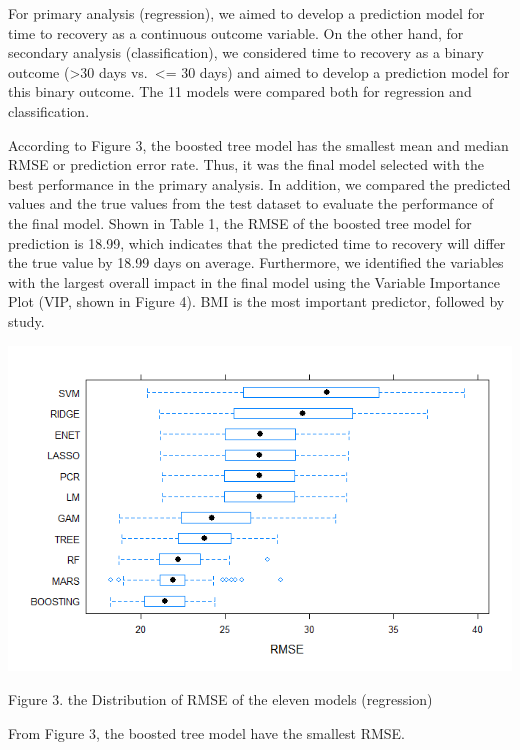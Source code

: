 \documentclass[
]{article}
\begin{document}
For primary analysis (regression), we aimed to develop a prediction
model for time to recovery as a continuous outcome variable. On the
other hand, for secondary analysis (classification), we considered time
to recovery as a binary outcome (\textgreater30 days vs.~\textless= 30
days) and aimed to develop a prediction model for this binary outcome.
The 11 models were compared both for regression and classification.

According to Figure 3, the boosted tree model has the smallest mean and
median RMSE or prediction error rate. Thus, it was the final model
selected with the best performance in the primary analysis. In addition,
we compared the predicted values and the true values from the test
dataset to evaluate the performance of the final model. Shown in Table
1, the RMSE of the boosted tree model for prediction is 18.99, which
indicates that the predicted time to recovery will differ the true value
by 18.99 days on average. Furthermore, we identified the variables with
the largest overall impact in the final model using the Variable
Importance Plot (VIP, shown in Figure 4). BMI is the most important
predictor, followed by study.

\begin{center}\includegraphics[width=0.9\linewidth,height=0.7\textheight]{primary_analysis_plot/resample_plot} \end{center}
\begin{center}
Figure 3. the Distribution of RMSE of the eleven models (regression)
\end{center}

From Figure 3, the boosted tree model have the smallest RMSE.
\end{document}
